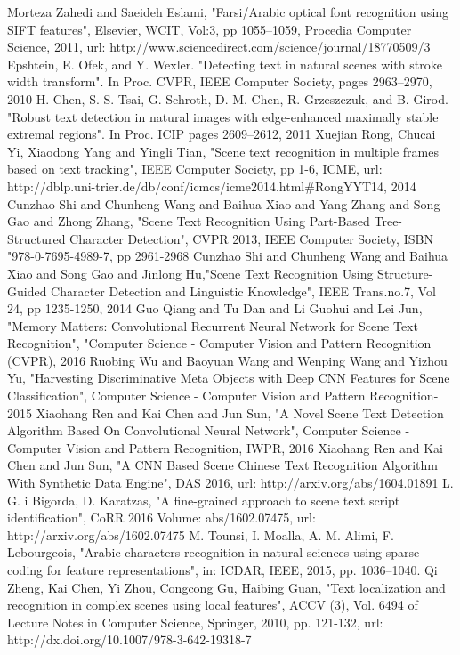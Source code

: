 \documentclass[conference]{IEEEtran}
\begin{document}
\begin{thebibliography}{1}
Morteza Zahedi and Saeideh Eslami, "Farsi/Arabic optical font recognition using {SIFT} features", Elsevier, WCIT, Vol:3, pp 1055--1059, Procedia Computer Science, 2011, url: http://www.sciencedirect.com/science/journal/18770509/3
Epshtein, E. Ofek, and Y. Wexler. "Detecting text in natural scenes with stroke width transform". In Proc. CVPR, IEEE Computer Society, pages 2963–2970, 2010
H. Chen, S. S. Tsai, G. Schroth, D. M. Chen, R. Grzeszczuk, and B. Girod. "Robust text detection in natural images with edge-enhanced maximally stable extremal regions". In Proc. ICIP pages 2609–2612, 2011
Xuejian Rong, Chucai Yi, Xiaodong Yang and Yingli Tian, "Scene text recognition in multiple frames based on text tracking",  IEEE Computer Society, pp 1-6, ICME, url: http://dblp.uni-trier.de/db/conf/icmcs/icme2014.html\#RongYYT14, 2014
Cunzhao Shi and Chunheng Wang and Baihua Xiao and Yang Zhang and Song Gao and Zhong Zhang, "Scene Text Recognition Using Part-Based Tree-Structured Character Detection", CVPR 2013, IEEE Computer Society, ISBN "978-0-7695-4989-7, pp 2961-2968
Cunzhao Shi and Chunheng Wang and Baihua Xiao and Song Gao and Jinlong Hu,"Scene Text Recognition Using Structure-Guided	Character Detection and Linguistic Knowledge", IEEE Trans.no.7, Vol 24, pp 1235-1250, 2014
Guo Qiang and Tu Dan and Li Guohui and Lei Jun, "Memory Matters: Convolutional Recurrent Neural Network for Scene Text Recognition", "Computer Science - Computer Vision and Pattern Recognition (CVPR), 2016
Ruobing Wu and Baoyuan Wang and Wenping Wang and Yizhou Yu, "Harvesting Discriminative Meta Objects with Deep {CNN} Features for Scene Classification", Computer Science - Computer Vision and Pattern Recognition- 2015
Xiaohang Ren and Kai Chen and Jun Sun, "A Novel Scene Text Detection Algorithm Based On Convolutional Neural Network", Computer Science - Computer Vision and Pattern Recognition, IWPR, 2016
Xiaohang Ren and Kai Chen and Jun Sun, "A {CNN} Based Scene Chinese Text Recognition Algorithm With Synthetic Data Engine", DAS 2016, url: http://arxiv.org/abs/1604.01891
L. G. i Bigorda, D. Karatzas, "A fine-grained approach to scene text script identification", CoRR 2016 Volume: abs/1602.07475, url: http://arxiv.org/abs/1602.07475
M. Tounsi, I. Moalla, A. M. Alimi, F. Lebourgeois, "Arabic characters recognition in natural sciences using sparse coding for feature representations", in: ICDAR, IEEE, 2015, pp. 1036–1040.
Qi Zheng, Kai Chen, Yi Zhou, Congcong Gu, Haibing Guan, "Text localization and recognition in complex scenes using local features", ACCV (3), Vol. 6494 of Lecture Notes in Computer Science, Springer, 2010, pp. 121-132, url: http://dx.doi.org/10.1007/978-3-642-19318-7
\end{thebibliography}
\end{document}
